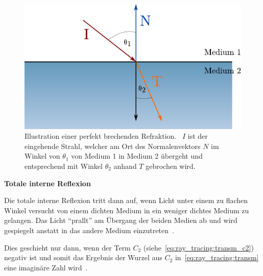 \begin{figure}[H]\label{fig:ray_tracing_specular_transmission}
    \centering
    \includegraphics{img/perfect_specular_tranmission.pdf}
    \caption{Illustration einer perfekt brechenden
        Refraktion.~\protect\footnotemark{}
        $I$ ist der eingehende Strahl, welcher am Ort des
        Normalenvektors $N$ im Winkel von $\theta_{1}$ von Medium 1 in
        Medium 2 übergeht und entsprechend mit Winkel $\theta_{2}$
        anhand $T$ gebrochen wird.}
\end{figure}

\textbf{Totale interne Reflexion}

Die totale interne Reflexion tritt dann auf, wenn Licht unter einem zu
flachen Winkel versucht von einem dichten Medium in ein weniger dichtes
Medium zu gelangen. Das Licht ``prallt'' am Übergang der beiden Medien ab
und wird gespiegelt anstatt in das andere Medium
einzutreten~\parencite[S. 136 bis 137]{glassner_introduction_1989}.

Dies geschieht nur dann, wenn der Term $C_{2}$
(siehe~\autoref{eq:ray_tracing:transm_c2}) negativ ist und somit das
Ergebnis der Wurzel aus $C_{2}$ in~\autoref{eq:ray_tracing:transm} eine
imaginäre Zahl wird~\parencite[S. 137 bis 138]{glassner_introduction_1989}.


